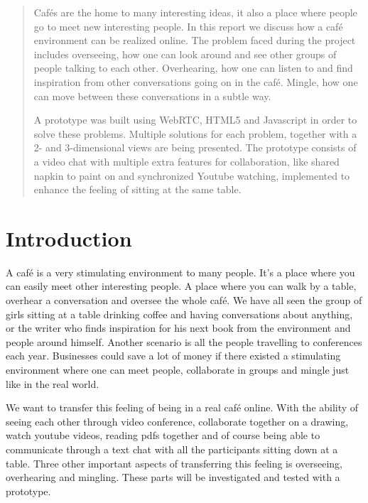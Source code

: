\documentclass[12pt, titlepage]{article}
\begin{document}
\maketitle

\begin{abstract}
Cafés are the home to many interesting ideas, it also a place where people go to meet new interesting people. In this report we discuss how a café environment can be realized online. The problem faced during the project includes overseeing, how one can look around and see other groups of people talking to each other. Overhearing, how one can listen to and find inspiration from other conversations going on in the café. Mingle, how one can move between these conversations in a subtle way.

A prototype was built using WebRTC, HTML5 and Javascript in order to solve these problems. Multiple solutions for each problem, together with a 2- and 3-dimensional views are being presented. The prototype consists of a video chat with multiple extra features for collaboration, like shared napkin to paint on and  synchronized Youtube watching, implemented to enhance the feeling of sitting at the same table. 
\end{abstract}
\tableofcontents
\section{Introduction}
A café is a very stimulating environment to many people. It’s a place where you can easily meet other interesting people. A place where you can walk by a table, overhear a conversation and oversee the whole café. We have all seen the group of girls sitting at a table drinking coffee and having conversations about anything, or the writer who finds inspiration for his next book from the environment and people around himself. Another scenario is all the people travelling to conferences each year. Businesses could save a lot of money if there existed a stimulating environment where one can meet people, collaborate in groups and mingle just like in the real world.

We want to transfer this feeling of being in a real café online. With the ability of seeing each other through video conference, collaborate together on a drawing, watch youtube videos, reading pdfs together and of course being able to communicate through a text chat with all the participants sitting down at a table. Three other important aspects of transferring this feeling is overseeing, overhearing and mingling. These parts will be investigated and tested with a prototype.
\end{document}
